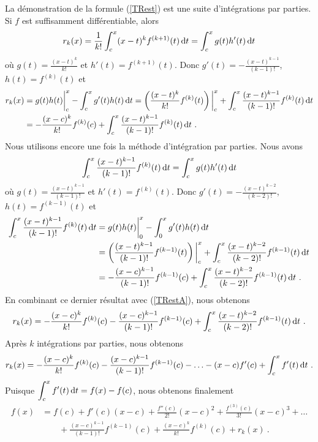 {\begin{rmk}[\theory]
La démonstration de la formule (\ref{TRest}) est une suite d'intégrations par
parties.  Si $f$ est suffisamment différentiable, alors
\[
r_k(x) = \frac{1}{k!} \int_c^x (x-t)^k f^{(k+1)}(t) \,\mathrm{d}t 
= \int_c^x g(t)h'(t) \,\mathrm{d}t
\]
où $\displaystyle g(t) = \frac{(x-t)^k}{k!}$ et $h'(t) = f^{(k+1)}(t)$.
Donc $\displaystyle g'(t) = -\frac{(x-t)^{k-1}}{(k-1)!}$, 
$h(t) = f^{(k)}(t)$ et
\begin{align}
r_k(x) &= g(t)h(t)\bigg|_c^x - \int_c^x g'(t)h(t)\,\mathrm{d}t =
\left(\frac{(x-t)^k}{k!} f^{(k)}(t)\right)\bigg|_c^x +
\int_c^x \frac{(x-t)^{k-1}}{(k-1)!} f^{(k)}(t) \,\mathrm{d}t \nonumber \\
&= -\frac{(x-c)^k}{k!} f^{(k)}(c)
+\int_c^x \frac{(x-t)^{k-1}}{(k-1)!} f^{(k)}(t) \,\mathrm{d}t \ . \label{TRestA}
\end{align}
Nous utilisons encore une fois la méthode d'intégration par parties.
Nous avons
\[
\int_c^x \frac{(x-t)^{k-1}}{(k-1)!} f^{(k)}(t) \,\mathrm{d}t
= \int_c^x g(t)h'(t) \,\mathrm{d}t
\]
où $\displaystyle g(t) = \frac{(x-t)^{k-1}}{(k-1)!}$ et
$h'(t) = f^{(k)}(t)$.  Donc
$\displaystyle g'(t) = -\frac{(x-t)^{k-2}}{(k-2)!}$, 
$h(t) = f^{(k-1)}(t)$ et
\begin{align*}
\int_c^x \frac{(x-t)^{k-1}}{(k-1)!} f^{(k)}(t) \,\mathrm{d}t
&= g(t)h(t)\bigg|_0^x - \int_0^x g'(t)h(t)\,\mathrm{d}t \\
&= \left(\frac{(x-t)^{k-1}}{(k-1)!} f^{(k-1)}(t)\right)\bigg|_c^x +
\int_c^x \frac{(x-t)^{k-2}}{(k-2)!} f^{(k-1)}(t) \,\mathrm{d}t \\
&= -\frac{(x-c)^{k-1}}{(k-1)!} f^{(k-1)}(c) 
+\int_c^x \frac{(x-t)^{k-2}}{(k-2)!} f^{(k-1)}(t) \,\mathrm{d}t \ .
\end{align*}
En combinant ce dernier résultat avec (\ref{TRestA}), nous obtenons
\[
r_k(x) = -\frac{(x-c)^k}{k!} f^{(k)}(c)
-\frac{(x-c)^{k-1}}{(k-1)!} f^{(k-1)}(c) 
+\int_c^x \frac{(x-t)^{k-2}}{(k-2)!} f^{(k-1)}(t) \,\mathrm{d}t \ .
\]
Après $k$ intégrations par parties, nous obtenons
\[
r_k(x) = -\frac{(x-c)^k}{k!} f^{(k)}(c)
-\frac{(x-c)^{k-1}}{(k-1)!} f^{(k-1)}(c) -
\ldots - (x-c) f'(c) +\int_c^x f'(t) \,\mathrm{d}t \ .
\]
Puisque $\displaystyle \int_c^x f'(t)\,\mathrm{d}t = f(x)-f(c)$, nous obtenons
finalement
\begin{align*}
f(x) &= f(c) +  f'(c) (x-c) + \frac{f''(c)}{2!}(x-c)^2
+ \frac{f^{(3)}(c)}{3!} (x-c)^3 + \ldots \\
&\qquad
+ \frac{(x-c)^{k-1}}{(k-1)!} f^{(k-1)}(c) + \frac{(x-c)^k}{k!} f^{(k)}(c)
+ r_k(x) \ .
\end{align*}


\end{rmk}}
